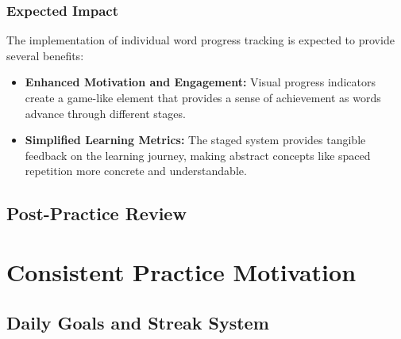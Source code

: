 \subsubsection{Expected Impact}

The implementation of individual word progress tracking is expected to provide several benefits:

\begin{itemize}
    \item \textbf{Enhanced Motivation and Engagement:} Visual progress indicators create a game-like element that provides a sense of achievement as words advance through different stages.
    
    \item \textbf{Simplified Learning Metrics:} The staged system provides tangible feedback on the learning journey, making abstract concepts like spaced repetition more concrete and understandable.
\end{itemize}

\subsection{Post-Practice Review}

\section{Consistent Practice Motivation}
\label{sec:em-gamification-practice-motivation}

\subsection{Daily Goals and Streak System}

